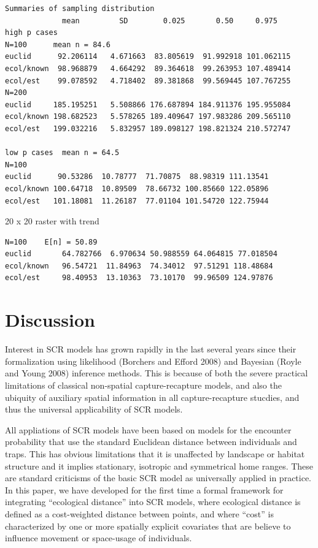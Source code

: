 \begin{verbatim}
Summaries of sampling distribution
             mean         SD        0.025       0.50     0.975
high p cases  
N=100      mean n = 84.6
euclid      92.206114   4.671663  83.805619  91.992918 101.062115 
ecol/known  98.968879   4.664292  89.364618  99.263953 107.489414 
ecol/est    99.078592   4.718402  89.381868  99.569445 107.767255 
N=200
euclid     185.195251   5.508866 176.687894 184.911376 195.955084 
ecol/known 198.682523   5.578265 189.409647 197.983286 209.565110 
ecol/est   199.032216   5.832957 189.098127 198.821324 210.572747 

low p cases  mean n = 64.5 
N=100
euclid      90.53286  10.78777  71.70875  88.98319 111.13541 
ecol/known 100.64718  10.89509  78.66732 100.85660 122.05896 
ecol/est   101.18081  11.26187  77.01104 101.54720 122.75944 

\end{verbatim}

20 x 20 raster with trend
\begin{verbatim}
N=100    E[n] = 50.89
euclid       64.782766  6.970634 50.988559 64.064815 77.018504 
ecol/known   96.54721  11.84963  74.34012  97.51291 118.48684 
ecol/est     98.40953  13.10363  73.10170  99.96509 124.97876 
\end{verbatim}


\section{Discussion}

Interest in SCR models has grown rapidly in the last several years
since their formalization using likelihood (Borchers and Efford 2008)
and Bayesian (Royle and Young 2008) inference methods. This is because
of both the severe practical limitations of classical non-spatial
capture-recapture models, and also the ubiquity of auxiliary spatial
information in all capture-recapture stucdies, and thus the universal
applicability of SCR models.

All appliations of SCR models have been based on models for the
encounter probability that use the standard Euclidean distance between
individuals and traps. This has obvious limitations that it is
unaffected by landscape or habitat structure and it implies
stationary,  isotropic and symmetrical home ranges. These are standard
criticisms of the basic SCR model as universally applied in practice. 
In this paper,  we have developed for the first time a formal framework for integrating
``ecological distance'' into SCR models, where ecological distance is
defined as a cost-weighted distance between points, and where ``cost''
is characterized by one or more spatially explicit covariates that are
believe to influence movement or space-usage of individuals.  

